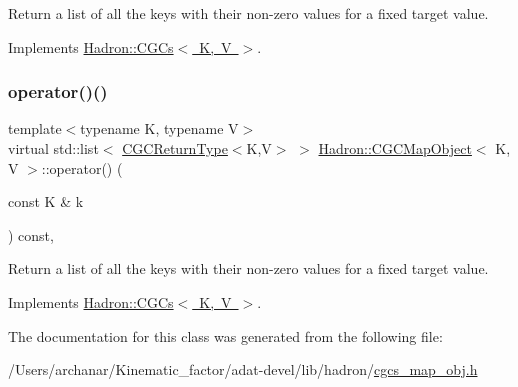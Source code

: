 Return a list of all the keys with their non-\/zero values for a fixed target value. 



Implements \mbox{\hyperlink{classHadron_1_1CGCs_a8d2d80be37b603359708ebdd5923ff47}{Hadron\+::\+C\+G\+Cs$<$ K, V $>$}}.

\mbox{\label{classHadron_1_1CGCMapObject_aeb342dc81f17743a25b969f540db4edf}} 
\subsubsection{\texorpdfstring{operator()()}{operator()()}\hspace{0.1cm}{\footnotesize\ttfamily [6/6]}}
{\footnotesize\ttfamily template$<$typename K, typename V$>$ \\
virtual std\+::list$<$ \mbox{\hyperlink{structHadron_1_1CGCReturnType}{C\+G\+C\+Return\+Type}}$<$K,V$>$ $>$ \mbox{\hyperlink{classHadron_1_1CGCMapObject}{Hadron\+::\+C\+G\+C\+Map\+Object}}$<$ K, V $>$\+::operator() (\begin{DoxyParamCaption}\item[{const K \&}]{k }\end{DoxyParamCaption}) const\hspace{0.3cm}{\ttfamily [inline]}, {\ttfamily [virtual]}}



Return a list of all the keys with their non-\/zero values for a fixed target value. 



Implements \mbox{\hyperlink{classHadron_1_1CGCs_a8d2d80be37b603359708ebdd5923ff47}{Hadron\+::\+C\+G\+Cs$<$ K, V $>$}}.



The documentation for this class was generated from the following file\+:\begin{DoxyCompactItemize}
\item 
/\+Users/archanar/\+Kinematic\+\_\+factor/adat-\/devel/lib/hadron/\mbox{\hyperlink{adat-devel_2lib_2hadron_2cgcs__map__obj_8h}{cgcs\+\_\+map\+\_\+obj.\+h}}\end{DoxyCompactItemize}
